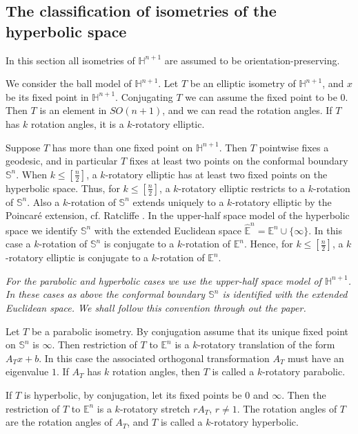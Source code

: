 \documentclass[11pt]{amsart}
\theoremstyle{definition}
\theoremstyle{remark}
\numberwithin{equation}{section}
\theoremstyle{plain}
\begin{document}
\subsection{The classification of isometries of the hyperbolic space} 
In this section all isometries of ${\mathbb H}^{n+1}$ are assumed to be orientation-preserving. 

We consider the ball model of ${\mathbb H}^{n+1}$. Let $T$ be an elliptic isometry of ${\mathbb H}^{n+1}$, and $x$ be its fixed point in ${\mathbb H}^{n+1}$. Conjugating $T$ we can assume the fixed point to be $0$. Then $T$ is an element in $SO(n+1)$, and we can read the rotation angles. If $T$ has $k$ rotation angles, it is a $k$-rotatory elliptic. 

Suppose $T$ has more than one fixed point on ${\mathbb H}^{n+1}$. Then $T$ pointwise fixes a geodesic, and in particular $T$ fixes at least two points on the conformal boundary ${\mathbb S}^n$. When $k \leq [\frac{n}{2}]$, a $k$-rotatory elliptic has at least two fixed points on the hyperbolic space.  Thus, for $k \leq [\frac{n}{2}]$,  a $k$-rotatory elliptic restricts to a $k$-rotation of ${\mathbb S}^n$. Also a $k$-rotation of ${\mathbb S}^n$ extends uniquely to a $k$-rotatory elliptic by the Poincar\'e extension, cf. Ratcliffe \cite{rat}. 
In the upper-half space model of the hyperbolic space we identify ${\mathbb S}^n$ with the extended Euclidean space $\hat {\mathbb E}^n={\mathbb E}^n \cup \{\infty\}$. In this case a $k$-rotation of ${\mathbb S}^n$ is conjugate to a $k$-rotation of ${\mathbb E}^n$. Hence, for $k \leq [\frac{n}{2}]$, a $k$-rotatory elliptic is conjugate to a $k$-rotation of ${\mathbb E}^n$. 

\medskip 
\emph{For the parabolic and hyperbolic cases we use the upper-half space model of ${\mathbb H}^{n+1}$. In these cases as above the conformal boundary ${\mathbb S}^n$ is identified with the extended Euclidean space. We shall follow this convention through out the paper. }

\medskip Let $T$ be a parabolic isometry. By conjugation assume that its unique fixed point on ${\mathbb S}^n$ is $\infty$. Then restriction of $T$ to ${\mathbb E}^n$ is a $k$-rotatory translation of the form $A_Tx+b$. In this case the associated orthogonal transformation $A_T$ must have an eigenvalue $1$. If $A_T$ has $k$ rotation angles, then $T$ is called a $k$-rotatory parabolic. 

If $T$ is hyperbolic, by conjugation, let its fixed points be $0$ and $\infty$. Then the restriction of $T$ to ${\mathbb E}^n$ is a $k$-rotatory stretch $rA_T$, $r \neq 1$. The rotation angles of $T$ are the rotation angles of $A_T$, and $T$ is called a $k$-rotatory hyperbolic. 
\end{document}
